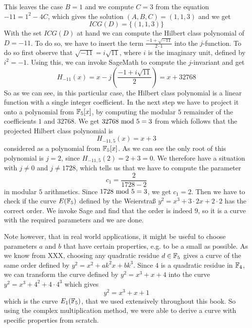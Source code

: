 \begin{example}
This leaves the case $B=1$ and we compute $C=3$ from the equation $-11 = 1^2 -4C$, which gives the solution $(A,B,C)=(1,1,3)$ and we get
$$
ICG(D)=\{(1,1,3)\}
$$
With the set $ICG(D)$ at hand we can compute the Hilbert class polynomial of $D=-11$. To do so, we have to insert the term $\frac{-1+\sqrt{-11}}{2\cdot1}$ into the $j$-function. To do so first observe that $\sqrt{-11}=i\sqrt{11}$, where $i$ is the imaginary unit, defined by $i^2=-1$. Using this, we can invoke SageMath to compute the $j$-invariant and get 
$$
H_{-11}(x) = x - j\left(\frac{-1+i\sqrt{11}}{2}\right) = x + 32768
$$
So as we can see, in this particular case, the Hilbert class polynomial is a linear function with a single integer coefficient. In the next step we have to project it onto a polynomial from $\mathbb{F}_5[x]$, by computing the modular $5$ remainder of the coefficients $1$ and $32768$. We get $32768 \text{ mod } 5=3$ from which follows that the projected Hilbert class polynomial is  
$$
H_{-11,5}(x)=x+3
$$ 
considered as a polynomial from $\mathbb{F}_5[x]$. As we can see the only root of this polynomial is $j=2$, since $H_{-11,5}(2)=2+3=0$. We therefore have a situation with $j\neq 0$ and $j\neq 1728$, which tells us that we have to compute the parameter
$$
c_1=\frac{2}{1728-2}
$$
in modular $5$ arithmetics. Since $1728 \text{ mod } 5=3$, we get $c_1=2$. Then we have to check if the curve $E(\mathbb{F}_5)$ defined by the Weierstraß  $y^2 = x^3 + 3\cdot 2 x + 2\cdot 2$ has the correct order. We invoke Sage and find that the order is indeed $9$, so it is a curve with the required parameters and we are done.

Note however, that in real world applications, it might be useful to choose parameters $a$ and $b$ that have certain properties, e.g. to be a small as possible. As we know from XXX, choosing any quadratic residue $d\in \mathbb{F}_5$ gives a curve of the same order defined by $y^2 = x^2 + a k^2 x + bk^3$. Since $4$ is a quadratic residue in $\mathbb{F}_4$, we can transform the curve defined by 
$y^2 = x^3 +x+4$ into the curve $y^2 = x^3 + 4^2 + 4\cdot 4^3$ which gives 
$$
y^2 = x^3 + x +1
$$
which is the curve $E_1(\mathbb{F}_5)$, that we used extensively throughout this book. So using the complex multiplication method, we were able to derive a curve with specific properties from scratch.
\end{example}
